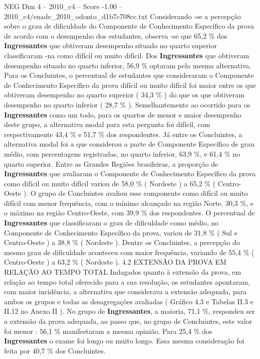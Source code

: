 \begin{textsample}{NEG Dim 4 – 2010\_c4 – Score -1.00 – 2010\_c4/enade\_2010\_odonto\_d1b7c708cc.txt}
Considerando -se a percepção sobre o grau de dificuldade do Componente de Conhecimento Específico da prova de acordo com o desempenho dos estudantes, observa -se que 65,2 \% dos \textbf{Ingressantes} que obtiveram desempenho situado no quarto superior classificaram -na como difícil ou muito difícil.
Dos \textbf{Ingressantes} que obtiveram desempenho situado no quarto inferior, 56,9 \% optaram pela mesma alternativa.
Para os Concluintes, o percentual de estudantes que consideraram o Componente de Conhecimento Específico da prova difícil ou muito difícil foi maior entre os que obtiveram desempenho no quarto superior ( 34,3 \% ) do que os que obtiveram desempenho no quarto inferior ( 28,7 \% ).
Semelhantemente ao ocorrido para os \textbf{Ingressantes} como um todo, para os quartos de menor e maior desempenho deste grupo, a alternativa modal para esta pergunta foi difícil, com respectivamente 43,4 \% e 51,7 \% dos respondentes.
Já entre os Concluintes, a alternativa modal foi a que considerou a parte de Componente Específico de grau médio, com percentagens registradas, no quarto inferior, 63,9 \%, e 61,4 \% no quarto superior.
Entre as Grandes Regiões brasileiras, a proporção de \textbf{Ingressantes} que avaliaram o Componente de Conhecimento Específico da prova como difícil ou muito difícil variou de 58,0 \% ( Nordeste ) a 65,2 \% ( Centro-Oeste ).
O grupo de Concluintes avaliou esse componente como difícil ou muito difícil com menor frequência, com o mínimo alcançado na região Norte, 30,3 \%, e o máximo na região Centro-Oeste, com 39,9 \% dos respondentes.
O percentual de \textbf{Ingressantes} que classificaram o grau de dificuldade como médio, no Componente de Conhecimento Específico da prova, variou de 31,8 \% ( Sul e Centro-Oeste ) a 38,8 \% ( Nordeste ).
Dentre os Concluintes, a percepção do mesmo grau de dificuldade aconteceu com maior frequência, variando de 55,4 \% ( Centro-Oeste ) a 63,2 \% ( Nordeste ). 4.2 EXTENSÃO DA PROVA EM RELAÇÃO AO TEMPO TOTAL Indagados quanto à extensão da prova, em relação ao tempo total oferecido para a sua resolução, os estudantes apontaram, com maior incidência, a alternativa que considerava a extensão adequada, para ambos os grupos e todas as desagregações avaliadas ( Gráfico 4.3 e Tabelas II.3 e II.12 no Anexo II ).
No grupo de \textbf{Ingressantes}, a maioria, 71,1 \%, respondeu ser a extensão da prova adequada, ao passo que, no grupo de Concluintes, este valor foi menor : 56,1 \% manifestaram a mesma opinião.
Para 25,4 \% dos \textbf{Ingressantes} o exame foi longo ou muito longo.
Essa mesma consideração foi feita por 40,7 \% dos Concluintes.

\end{textsample}
